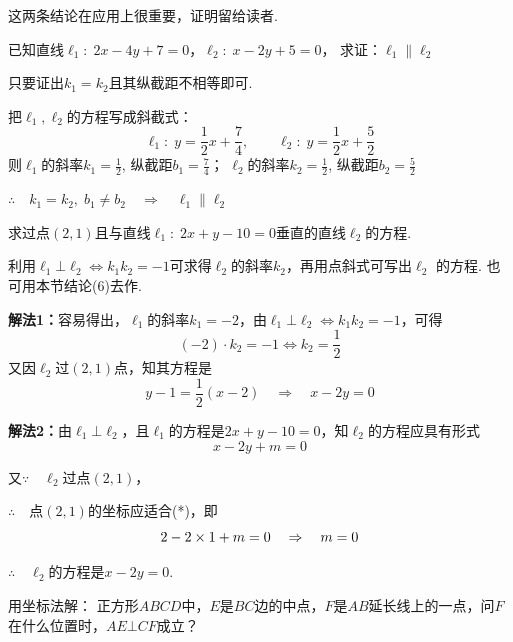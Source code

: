 这两条结论在应用上很重要，证明留给读者.





\begin{example}
已知直线$\ell_1:\; 2x-4y+7=0$，$\ell_2:\; x-2y+5=0$，
    求证：$\ell_1\parallel \ell_2$
\end{example}

\begin{analyze}
    只要证出$k_1=k_2$且其纵截距不相等即可.
\end{analyze}

\begin{solution}
    把$\ell_1,\ell_2$的方程写成斜截式：
\[\ell_1:\; y=\frac{1}{2}x+\frac{7}{4},\qquad \ell_2:\; y=\frac{1}{2}x+\frac{5}{2}\]
则$\ell_1$的斜率$k_1=\frac12$, 纵截距$b_1=\frac74$； $\ell_2$的斜率$k_2=\frac12$, 纵截距$b_2=\frac52$

$\therefore\quad k_1=k_2,\; b_1\ne b_2\quad \Rightarrow\quad \ell_1\parallel \ell_2$
\end{solution}


\begin{example}
    求过点$(2,1)$且与直线$\ell_1:\; 2x+y-10=0$垂直的直线$\ell_2$的方程.
\end{example}

\begin{analyze}
    利用$\ell_1\bot\ell_2\Longleftrightarrow k_1k_2=-1$可求得$\ell_2$的斜率$k_2$，再用点斜式可写出$\ell_2$ 的方程. 也可用本节结论(6)去作.
\end{analyze}

\begin{solution}
\textbf{解法1：}容易得出，$\ell_1$的斜率$k_1=-2$，由$\ell_1\bot\ell_2\Longleftrightarrow k_1k_2=-1$，可得
\[(-2)\cdot k_2=-1\Longleftrightarrow k_2=\frac{1}{2}\]
又因$\ell_2$过$(2,1)$点，知其方程是
\[y-1=\frac{1}{2}(x-2)\quad \Rightarrow\quad x-2y=0\]

\textbf{解法2：}由$\ell_1\bot \ell_2$，且$\ell_1$的方程是$2x+y-10=0$，知$\ell_2$的方程应具有形式
\begin{equation}
    x-2y+m=0  \tag{*}
\end{equation}

又$\because\quad \ell_2$过点$(2,1)$，

$\therefore\quad $点$(2,1)$的坐标应适合(*)，即
\[2-2\times1+m=0\quad \Rightarrow\quad m=0\]

$\therefore\quad \ell_2$的方程是$x-2y=0$.
\end{solution}

\begin{example}
    用坐标法解：
正方形$ABCD$中，$E$是$BC$边的中点，$F$是$AB$延长线上的一点，问$F$在什么位置时，$AE\bot CF$成立？
\end{example}

